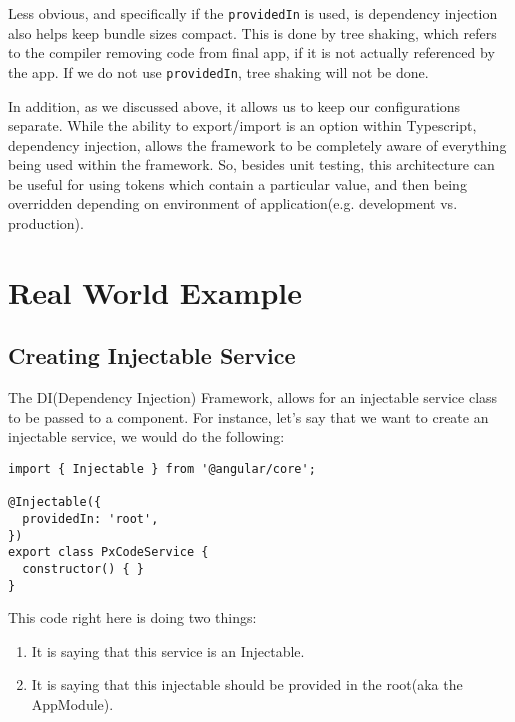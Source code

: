 Less obvious, and specifically if the \lstinline{providedIn} is used, is 
dependency injection also helps keep bundle sizes compact. This is done by tree
shaking, which refers to the compiler removing code from final app, if it is not
actually referenced by the app. If we do not use \lstinline{providedIn}, tree 
shaking will not be done. 

In addition, as we discussed above, it allows us to keep our configurations 
separate. While the ability to export/import is an option within Typescript, 
dependency injection, allows the framework to be completely aware of everything
being used within the framework. So, besides unit testing, this architecture 
can be useful for using tokens which contain a particular value, and then 
being overridden depending on environment of application(e.g. development vs.
production).

\section{ Real World Example }

\subsection{ Creating Injectable Service }
The DI(Dependency Injection) Framework, allows for an injectable service class
to be passed to a component. For instance, let's say that we want to create an
injectable service, we would do the following:
\begin{lstlisting}
import { Injectable } from '@angular/core';

@Injectable({
  providedIn: 'root',
})
export class PxCodeService {
  constructor() { }
}
\end{lstlisting}

This code right here is doing two things:
\begin{enumerate}
  \item It is saying that this service is an Injectable.
  \item It is saying that this injectable should be provided in the root(aka the
  AppModule).
\end{enumerate}


